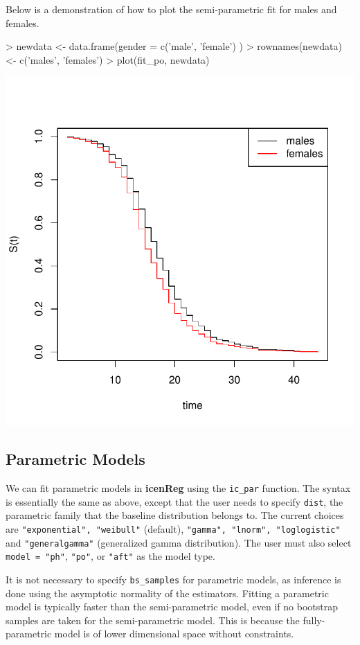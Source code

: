 \documentclass[a4paper]{article}
\begin{document}
Below is a demonstration of how to plot the semi-parametric fit for males and females.
  
\begin{Schunk}
\begin{Sinput}
>   newdata <- data.frame(gender = c('male', 'female') )
>   rownames(newdata) <- c('males', 'females')
>   plot(fit_po, newdata)
\end{Sinput}
\end{Schunk}
\includegraphics{icenReg-009}

\subsection{Parametric Models}
  
We can fit parametric models in {\bf icenReg} using the \texttt{ic\_par} function. The syntax is essentially the same as above, except that the user needs to specify \texttt{dist}, the parametric family that the baseline distribution belongs to. The current choices are \texttt{"exponential", "weibull"} (default), \texttt{"gamma", "lnorm", "loglogistic"} and \texttt{"generalgamma"} (generalized gamma distribution). The user must also select \texttt{model = "ph"},  \texttt{"po"}, or \texttt{"aft"} as the model type. 
  
It is not necessary to specify \texttt{bs\_samples} for parametric models, as inference is done using the asymptotic normality of the estimators. Fitting a parametric model is typically faster than the semi-parametric model, even if no bootstrap samples are taken for the semi-parametric model. This is because the fully-parametric model is of lower dimensional space without constraints. 
  
\end{document}

